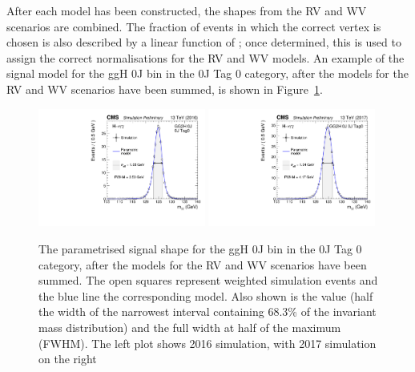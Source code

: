 After each model has been constructed, the shapes from the RV and WV scenarios are combined.
The fraction of events in which the correct vertex is chosen 
is also described by a linear function of \mH; 
once determined, this is used to assign the correct normalisations for the RV and WV models.
An example of the signal model for the ggH 0J bin in the 0J Tag 0 category, 
after the models for the RV and WV scenarios have been summed,
is shown in Figure~\ref{fig:sigbkg_proccat}.

\begin{figure}[hptb]
\centering
\includegraphics[width=0.49\textwidth]{Figures/SigBkg/GG2H_0J_RECO_0J_Tag0_2016.pdf}
\includegraphics[width=0.49\textwidth]{Figures/SigBkg/GG2H_0J_RECO_0J_Tag0_2017.pdf}
\caption{
  The parametrised signal shape for the ggH 0J bin in the 0J Tag 0 category, 
  after the models for the RV and WV scenarios have been summed.
  The open squares represent weighted simulation events and the blue line the
  corresponding model. Also shown is the \seff value (half the width of the narrowest interval
  containing 68.3\% of the invariant mass distribution) and the full width at half of the maximum
  (FWHM). The left plot shows 2016 simulation, with 2017 simulation on the right
}
\label{fig:sigbkg_proccat}
\end{figure}

